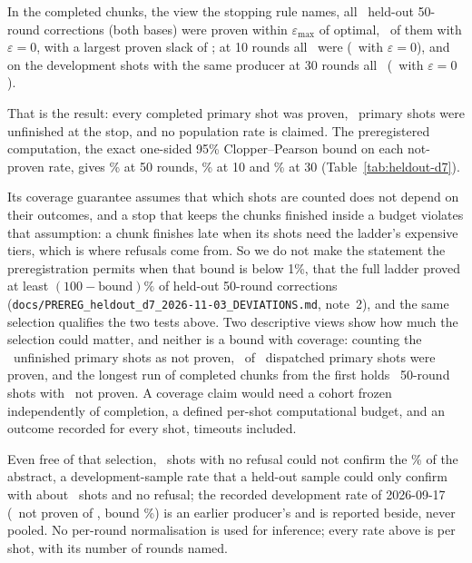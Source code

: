 \documentclass[aps,pra,twocolumn,superscriptaddress,nofootinbib,longbibliography,floatfix]{revtex4-2}
\newcommand{\eps}{\varepsilon}
\begin{document}
In the completed chunks, the view the stopping rule names, all \HoDSevenN\ held-out 50-round corrections (both bases) were proven within $\eps_{\max}$ of optimal, \HoDSevenExact\ of them with $\eps=0$, with a largest proven slack of \HoDSevenLargestEps; at 10 rounds all \HoDSevenTenN\ were (\HoDSevenTenExact\ with $\eps=0$), and on the development shots with the same producer at 30 rounds all \HoDSevenDevN\ (\HoDSevenDevExact\ with $\eps=0$). \HoDSevenReading

That is the result: every completed primary shot was proven, \HoDSevenUnfinishedPrimaryShots\ primary shots were unfinished at the stop, and no population rate is claimed. The preregistered computation, the exact one-sided 95\% Clopper--Pearson bound on each not-proven rate, gives \HoDSevenUpper\% at 50 rounds, \HoDSevenTenUpper\% at 10 and \HoDSevenDevUpper\% at 30 (Table~\ref{tab:heldout-d7}).

Its coverage guarantee assumes that which shots are counted does not depend on their outcomes, and a stop that keeps the chunks finished inside a budget violates that assumption: a chunk finishes late when its shots need the ladder's expensive tiers, which is where refusals come from. So we do not make the statement the preregistration permits when that bound is below 1\%, that the full ladder proved at least $(100-\text{bound})\%$ of held-out 50-round corrections (\nolinkurl{docs/PREREG_heldout_d7_2026-11-03_DEVIATIONS.md}, note~2), and the same selection qualifies the two tests above. Two descriptive views show how much the selection could matter, and neither is a bound with coverage: counting the \HoDSevenUnfinishedPrimaryShots\ unfinished primary shots as not proven, \HoDSevenWorstProven\ of \HoDSevenWorstN\ dispatched primary shots were proven, and the longest run of completed chunks from the first holds \HoDSevenPrefixN\ 50-round shots with \HoDSevenPrefixNotProven\ not proven. A coverage claim would need a cohort frozen independently of completion, a defined per-shot computational budget, and an outcome recorded for every shot, timeouts included.

Even free of that selection, \HoDSevenN\ shots with no refusal could not confirm the \EpsHwGenSixPct\% of the abstract, a development-sample rate that a held-out sample could only confirm with about \HoDSevenConfirmN\ shots and no refusal; the recorded development rate of 2026-09-17 (\HoDSevenRecordedDevNotProven\ not proven of \HoDSevenRecordedDevN, bound \HoDSevenRecordedDevUpper\%) is an earlier producer's and is reported beside, never pooled. No per-round normalisation is used for inference; every rate above is per shot, with its number of rounds named.
\end{document}
